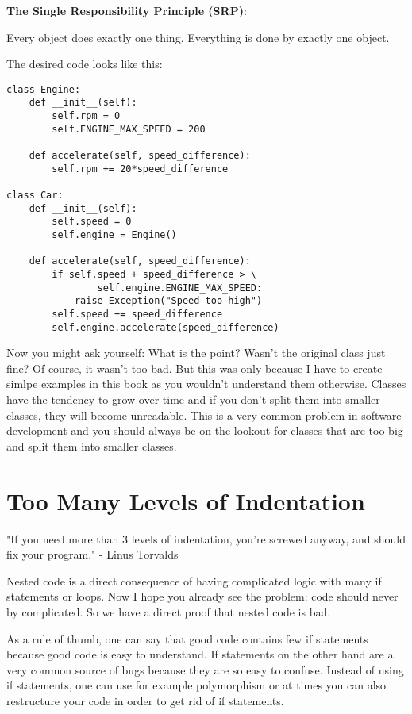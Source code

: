 \begin{tcolorbox}
\textbf{The Single Responsibility Principle (SRP)}:

Every object does exactly one thing. Everything is done by exactly one object.
\end{tcolorbox}

The desired code looks like this:

\begin{programcode}{}
\begin{verbatim}
class Engine:
    def __init__(self):
        self.rpm = 0
        self.ENGINE_MAX_SPEED = 200

    def accelerate(self, speed_difference):
        self.rpm += 20*speed_difference

class Car:
    def __init__(self):
        self.speed = 0
        self.engine = Engine()
        
    def accelerate(self, speed_difference):
        if self.speed + speed_difference > \
                self.engine.ENGINE_MAX_SPEED:
            raise Exception("Speed too high")
        self.speed += speed_difference
        self.engine.accelerate(speed_difference)
\end{verbatim}
\end{programcode}

Now you might ask yourself: What is the point? Wasn't the original class just fine? Of course, it wasn't too bad. But this was only because I have to create simlpe examples in this book as you wouldn't understand them otherwise. Classes have the tendency to grow over time and if you don't split them into smaller classes, they will become unreadable. This is a very common problem in software development and you should always be on the lookout for classes that are too big and split them into smaller classes.

\section{Too Many Levels of Indentation}

"If you need more than 3 levels of indentation, you’re screwed anyway, and should fix your program." - Linus Torvalds

Nested code is a direct consequence of having complicated logic with many if statements or loops. Now I hope you already see the problem: code should never by complicated. So we have a direct proof that nested code is bad.

As a rule of thumb, one can say that good code contains few if statements because good code is easy to understand. If statements on the other hand are a very common source of bugs because they are so easy to confuse. Instead of using if statements, one can use for example polymorphism or at times you can also restructure your code in order to get rid of if statements.


